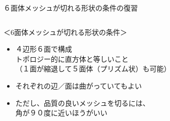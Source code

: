 \begin{frame}{６面体メッシュが切れる形状の条件の復習}
   \begin{columns}[t]
    \begin{column}{0.7\textwidth}
      ＜6面体メッシュが切れる形状の条件＞
      \begin{itemize}
        \item[(1)] ４辺形６面で構成 \\
	           トポロジー的に直方体と等しいこと \\
		   （１面が縮退して５面体（プリズム状）も可能）
	\item[(2)] それぞれの辺／面は曲がっていてもよい
	\item[(3)] ただし、品質の良いメッシュを切るには、\\
		   角が９０度に近いほうがいい
      \end{itemize}
    \end{column}
    \begin{column}{0.3\textwidth}
    \end{column}
  \end{columns}
\end{frame}
